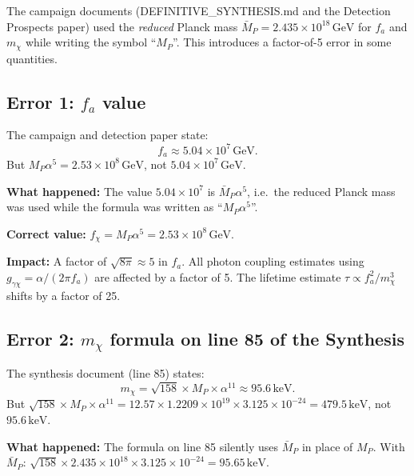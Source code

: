 \documentclass[11pt]{article}
\newcommand{\MP}{M_P}
\newcommand{\MPbar}{\bar{M}_P}
\newcommand{\GeV}{\,\mathrm{GeV}}
\newcommand{\keV}{\,\mathrm{keV}}
\begin{document}
\begin{tcolorbox}[colback=red!5!white, colframe=red!70!black,
  title=\textbf{Critical Finding: The R10 and 20-Agent Campaigns Used Mixed Conventions}]
The campaign documents (DEFINITIVE\_SYNTHESIS.md and the Detection Prospects
paper) used the \textit{reduced} Planck mass $\MPbar = 2.435 \times 10^{18}\GeV$
for $f_a$ and $m_\chi$ while writing the symbol ``$\MP$''.
This introduces a factor-of-5 error in some quantities.
\end{tcolorbox}

\subsection{Error 1: $f_a$ value}

The campaign and detection paper state:
\begin{equation}
  f_a \approx 5.04 \times 10^7\GeV.
\end{equation}
But $\MP\alpha^5 = 2.53 \times 10^8\GeV$, not $5.04 \times 10^7\GeV$.

\textbf{What happened:} The value $5.04 \times 10^7$ is $\MPbar\alpha^5$,
i.e.\ the reduced Planck mass was used while the formula was written as
``$\MP\alpha^5$''.

\textbf{Correct value:} $f_\chi = \MP\alpha^5 = 2.53 \times 10^8\GeV$.

\textbf{Impact:} A factor of $\sqrt{8\pi} \approx 5$ in $f_a$.
All photon coupling estimates using $g_{\gamma\chi} = \alpha/(2\pi f_a)$
are affected by a factor of 5. The lifetime estimate
$\tau \propto f_a^2/m_\chi^3$ shifts by a factor of 25.

\subsection{Error 2: $m_\chi$ formula on line 85 of the Synthesis}

The synthesis document (line 85) states:
\begin{equation}
  m_\chi = \sqrt{158} \times \MP \times \alpha^{11} \approx 95.6\keV.
\end{equation}
But $\sqrt{158} \times \MP \times \alpha^{11}
= 12.57 \times 1.2209 \times 10^{19} \times 3.125 \times 10^{-24}
= 479.5\keV$, not $95.6\keV$.

\textbf{What happened:} The formula on line 85 silently uses
$\MPbar$ in place of $\MP$.
With $\MPbar$: $\sqrt{158} \times 2.435 \times 10^{18} \times 3.125 \times 10^{-24}
= 95.65\keV$. \checkmark
\end{document}
